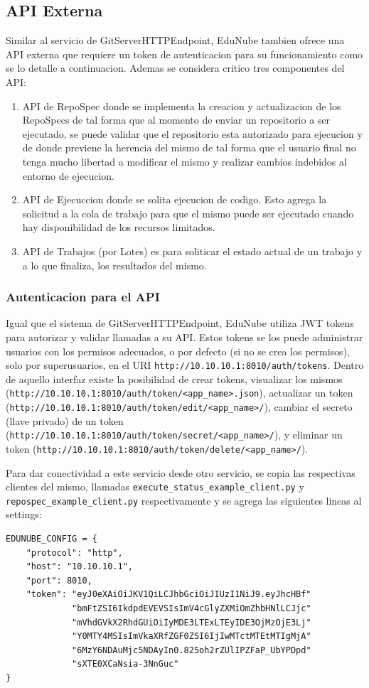 \subsection{API Externa}
Similar al servicio de GitServerHTTPEndpoint, EduNube tambien ofrece una API externa que requiere un token de autenticacion para su funcionamiento como se lo detalle a continuacion. Ademas se considera critico tres componentes del API:
\begin{enumerate}
  \item API de RepoSpec donde se implementa la creacion y actualizacion de los RepoSpecs de tal forma que al momento de enviar un repositorio a ser ejecutado, se puede validar que el repositorio esta autorizado para ejecucion y de donde previene la herencia del mismo de tal forma que el usuario final no tenga mucho libertad a modificar el mismo y realizar cambios indebidos al entorno de ejecucion.
  \item API de Ejecuccion donde se solita ejecucion de codigo. Esto agrega la solicitud a la cola de trabajo para que el mismo puede ser ejecutado cuando hay disponibilidad de los recursos limitados.
  \item API de Trabajos (por Lotes) es para soliticar el estado actual de un trabajo y a lo que finaliza, los resultados del mismo.
\end{enumerate}
\subsubsection{Autenticacion para el API}
Igual que el sistema de GitServerHTTPEndpoint, EduNube utiliza JWT tokens para autorizar y validar llamadas a su API. Estos tokens se los puede administrar usuarios con los permisos adecuados, o por defecto (si no se crea los permisos), solo por superusuarios, en el URI \texttt{http://10.10.10.1:8010/auth/tokens}. Dentro de aquello interfaz existe la posibilidad de crear tokens, visualizar los mismos \\
(\texttt{http://10.10.10.1:8010/auth/token/<app\_name>.json}), actualizar un token (\texttt{http://10.10.10.1:8010/auth/token/edit/<app\_name>/}), cambiar el secreto (llave privado) de un token\\
(\texttt{http://10.10.10.1:8010/auth/token/secret/<app\_name>/}), y eliminar un token (\texttt{http://10.10.10.1:8010/auth/token/delete/<app\_name>/}).

Para dar conectividad a este servicio desde otro servicio, se copia las respectivas clientes del mismo, llamadas \texttt{execute\_status\_example\_client.py} y \\
\texttt{repospec\_example\_client.py} respectivamente y se agrega las siguientes lineas al settings:
\lstset{language=Python}
\begin{lstlisting}
EDUNUBE_CONFIG = {
    "protocol": "http",
    "host": "10.10.10.1",
    "port": 8010,
    "token": "eyJ0eXAiOiJKV1QiLCJhbGciOiJIUzI1NiJ9.eyJhcHBf"
             "bmFtZSI6IkdpdEVEVSIsImV4cGlyZXMiOmZhbHNlLCJjc"
             "mVhdGVkX2RhdGUiOiIyMDE3LTExLTEyIDE3OjMzOjE3Lj"
             "Y0MTY4MSIsImVkaXRfZGF0ZSI6IjIwMTctMTEtMTIgMjA"
             "6MzY6NDAuMjc5NDAyIn0.825oh2rZUlIPZFaP_UbYPDpd"
             "sXTE0XCaNsia-3NnGuc"
}
\end{lstlisting}

